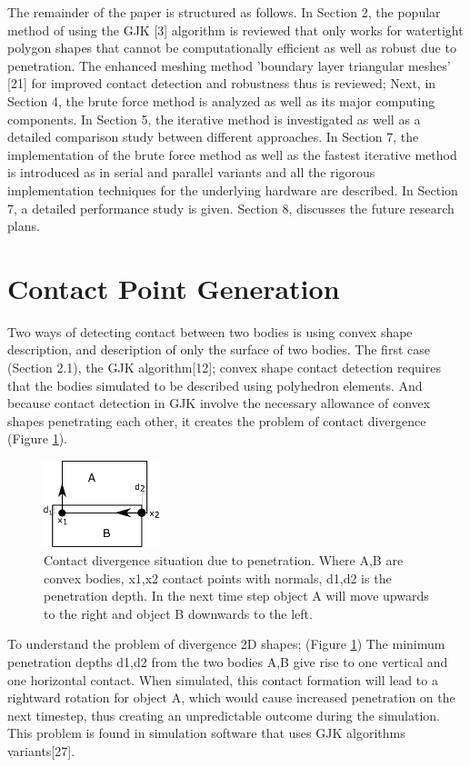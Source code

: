\documentclass[times,12pt]{ACME2015article}
\begin{document}
The remainder of the paper is structured as follows. In Section 2, the popular method of using the GJK [3] algorithm is reviewed that only works for watertight polygon shapes that cannot be computationally efficient as well as robust due to penetration. The enhanced meshing method 'boundary layer triangular meshes' [21] for improved contact detection and robustness thus is reviewed; Next, in Section 4, the brute force method is analyzed as well as its major computing components. In Section 5, the iterative method is investigated as well as a detailed comparison study between different approaches. In Section 7, the implementation of the brute force method as well as the fastest iterative method is introduced as in serial and parallel variants and all the rigorous implementation techniques for the underlying hardware are described. In Section 7, a detailed performance study is given. Section 8, discusses the future research plans.


\section{Contact Point Generation}

Two ways of detecting contact between two bodies is using convex shape description, and description of only the surface of two bodies. The first case (Section 2.1), the GJK algorithm[12]; convex shape contact detection requires that the bodies simulated to be described using polyhedron elements. And because contact detection in GJK involve the necessary allowance of convex shapes penetrating each other, it creates the problem of contact divergence (Figure \ref{fig1}).

\begin{figure}[!h]
\centering
\includegraphics[width=0.3\textwidth]{divergence} \protect\caption{\label{fig1}Contact divergence situation due to penetration. Where A,B are convex bodies, x1,x2 contact points with normals, d1,d2 is the penetration depth. In the next time step object A will move upwards to the right and object B downwards to the left.}
\end{figure} 

To understand the problem of divergence 2D shapes; (Figure \ref{fig1}) The minimum penetration depths d1,d2 from the two bodies A,B give rise to one vertical and one horizontal contact. When simulated, this contact formation will lead to a rightward rotation for object A, which would cause increased penetration on the next timestep, thus creating an unpredictable outcome during the simulation. This problem is found in simulation software that uses GJK algorithms variants[27]. 
\end{document}
